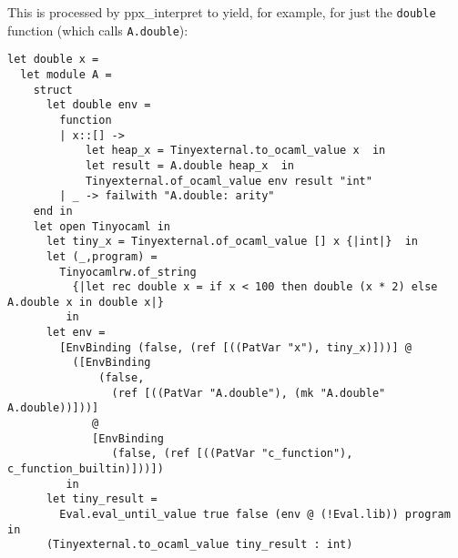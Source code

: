 \documentclass[10pt]{article}
\begin{document}
\noindent This is processed by \textsf{ppx\_interpret} to yield, for example, for just the \texttt{double} function (which calls \texttt{A.double}):

{\small\begin{verbatim}
let double x =
  let module A =
    struct
      let double env =
        function
        | x::[] ->
            let heap_x = Tinyexternal.to_ocaml_value x  in
            let result = A.double heap_x  in
            Tinyexternal.of_ocaml_value env result "int"
        | _ -> failwith "A.double: arity" 
    end in
    let open Tinyocaml in
      let tiny_x = Tinyexternal.of_ocaml_value [] x {|int|}  in
      let (_,program) =
        Tinyocamlrw.of_string
          {|let rec double x = if x < 100 then double (x * 2) else A.double x in double x|}
         in
      let env =
        [EnvBinding (false, (ref [((PatVar "x"), tiny_x)]))] @
          ([EnvBinding
              (false,
                (ref [((PatVar "A.double"), (mk "A.double" A.double))]))]
             @
             [EnvBinding
                (false, (ref [((PatVar "c_function"), c_function_builtin)]))])
         in
      let tiny_result =
        Eval.eval_until_value true false (env @ (!Eval.lib)) program  in
      (Tinyexternal.to_ocaml_value tiny_result : int)
\end{verbatim}}
\end{document}
